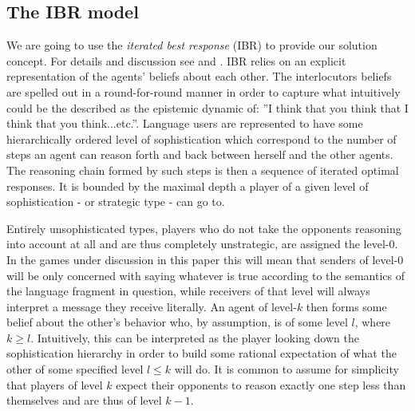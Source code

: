 \documentclass[10]{article}
\begin{document}
\subsection{The IBR model}
We are going to use the \textit{iterated best response} (IBR) to provide our solution concept. %
For details and discussion see \cite{franke2009signal} and \cite{franke2014pragmatic}. IBR relies on an explicit representation of the agents' beliefs about each other. The interlocutors beliefs are spelled out in a round-for-round manner in order to capture what intuitively could be the described as the epistemic dynamic of: ''I think that you think that I think that you think...etc.''. Language users are represented to have some hierarchically ordered level of sophistication which correspond to the number of steps an agent can reason forth and back between herself and the other agents. The reasoning chain formed by such steps is then a sequence of iterated optimal responses. It is bounded by the maximal depth a player of a given level of sophistication - or strategic type - can go to. 

Entirely unsophisticated types, players who do not take the opponents reasoning into account at all and are thus completely unstrategic, are assigned the level-0. In the games under discussion in this paper this will mean that senders of level-0 will be only concerned with saying whatever is true according to the semantics of the language fragment in question, while receivers of that level will always interpret a message they receive literally. An agent of level-$k$ then forms some belief about the other's behavior who, by assumption, is of some level $l$, where $k\geq l$. Intuitively, this can be interpreted as the player looking down the sophistication hierarchy in order to build some rational expectation of what the other of some specified level $l\leq k$ will do. It is common to assume for simplicity that players of level $k$ expect their opponents to reason exactly one step less than themselves and are thus of level $k-1$.
\end{document}
